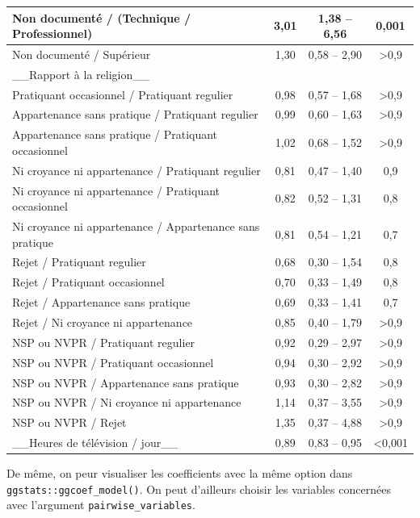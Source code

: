 \documentclass[
  letterpaper,
  DIV=11,
  numbers=noendperiod,
  oneside]{scrreprt}
\begin{document}
\begin{table}
\begin{tabular}{l|c|c|c}
\hline
Non documenté / (Technique / Professionnel) & 3,01 & 1,38 – 6,56 & 0,001\\
\hline
Non documenté / Supérieur & 1,30 & 0,58 – 2,90 & >0,9\\
\hline
\_\_Rapport à la religion\_\_ &  &  & \\
\hline
Pratiquant occasionnel / Pratiquant regulier & 0,98 & 0,57 – 1,68 & >0,9\\
\hline
Appartenance sans pratique / Pratiquant regulier & 0,99 & 0,60 – 1,63 & >0,9\\
\hline
Appartenance sans pratique / Pratiquant occasionnel & 1,02 & 0,68 – 1,52 & >0,9\\
\hline
Ni croyance ni appartenance / Pratiquant regulier & 0,81 & 0,47 – 1,40 & 0,9\\
\hline
Ni croyance ni appartenance / Pratiquant occasionnel & 0,82 & 0,52 – 1,31 & 0,8\\
\hline
Ni croyance ni appartenance / Appartenance sans pratique & 0,81 & 0,54 – 1,21 & 0,7\\
\hline
Rejet / Pratiquant regulier & 0,68 & 0,30 – 1,54 & 0,8\\
\hline
Rejet / Pratiquant occasionnel & 0,70 & 0,33 – 1,49 & 0,8\\
\hline
Rejet / Appartenance sans pratique & 0,69 & 0,33 – 1,41 & 0,7\\
\hline
Rejet / Ni croyance ni appartenance & 0,85 & 0,40 – 1,79 & >0,9\\
\hline
NSP ou NVPR / Pratiquant regulier & 0,92 & 0,29 – 2,97 & >0,9\\
\hline
NSP ou NVPR / Pratiquant occasionnel & 0,94 & 0,30 – 2,92 & >0,9\\
\hline
NSP ou NVPR / Appartenance sans pratique & 0,93 & 0,30 – 2,82 & >0,9\\
\hline
NSP ou NVPR / Ni croyance ni appartenance & 1,14 & 0,37 – 3,55 & >0,9\\
\hline
NSP ou NVPR / Rejet & 1,35 & 0,37 – 4,88 & >0,9\\
\hline
\_\_Heures de télévision / jour\_\_ & 0,89 & 0,83 – 0,95 & <0,001\\
\hline
\end{tabular}
\end{table}

De même, on peur visualiser les coefficients avec la même option dans
\texttt{ggstats::ggcoef\_model()}. On peut d'ailleurs choisir
les variables concernées avec l'argument \texttt{pairwise\_variables}.
\end{document}
